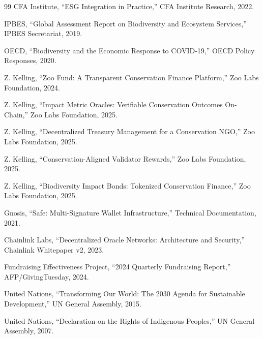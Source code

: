 \documentclass[11pt,letterpaper]{article}
\begin{document}
\begin{thebibliography}{99}
CFA Institute, ``ESG Integration in Practice,'' CFA Institute Research, 2022.

IPBES, ``Global Assessment Report on Biodiversity and Ecosystem Services,'' IPBES Secretariat, 2019.

OECD, ``Biodiversity and the Economic Response to COVID-19,'' OECD Policy Responses, 2020.

Z. Kelling, ``Zoo Fund: A Transparent Conservation Finance Platform,'' Zoo Labs Foundation, 2024.

Z. Kelling, ``Impact Metric Oracles: Verifiable Conservation Outcomes On-Chain,'' Zoo Labs Foundation, 2025.

Z. Kelling, ``Decentralized Treasury Management for a Conservation NGO,'' Zoo Labs Foundation, 2025.

Z. Kelling, ``Conservation-Aligned Validator Rewards,'' Zoo Labs Foundation, 2025.

Z. Kelling, ``Biodiversity Impact Bonds: Tokenized Conservation Finance,'' Zoo Labs Foundation, 2025.

Gnosis, ``Safe: Multi-Signature Wallet Infrastructure,'' Technical Documentation, 2021.

Chainlink Labs, ``Decentralized Oracle Networks: Architecture and Security,'' Chainlink Whitepaper v2, 2023.

Fundraising Effectiveness Project, ``2024 Quarterly Fundraising Report,'' AFP/GivingTuesday, 2024.

United Nations, ``Transforming Our World: The 2030 Agenda for Sustainable Development,'' UN General Assembly, 2015.

United Nations, ``Declaration on the Rights of Indigenous Peoples,'' UN General Assembly, 2007.

\end{thebibliography}
\end{document}
